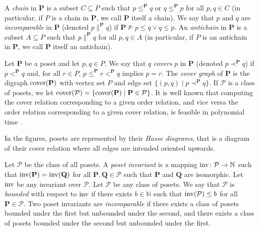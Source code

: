 \documentclass[usletter]{article}
\newcommand{\longversion}[1]{#1}
\newcommand{\shortversion}[1]{}
\newcommand{\longshort}[2]{\longversion{#1}\shortversion{#2}}
\newcommand{\pp}{\mathbf{P}}
\begin{document}
A \emph{chain} in $\pp$ is a subset $C \subseteq P$ 
such that $p \leq^{\pp} q$ or $q \leq^{\pp} p$ for all $p,q \in C$ 
(in particular, if $P$ is a chain in $\pp$, 
we call $\pp$ itself a chain).  
We say that $p$ and $q$ are \emph{incomparable} 
in $\pp$ (denoted $p \parallel^{\pp} q$) if 
$\pp \not\models p \leq q \vee q\leq p$.  
An \emph{antichain} in $\pp$ is a subset $A \subseteq P$ 
such that $p \parallel^{\pp} q$ for all $p,q \in A$ 
(in particular, if $P$ is an antichain in $\pp$, 
we call $\pp$ itself an antichain).  

Let $\pp$ be a poset and let $p,q \in P$.  We say that $q$ \emph{covers} $p$ in $\pp$ (denoted $p \prec^{\pp} q$) 
if $p<^{\pp}q$ and, for all $r \in P$, $p \leq^{\pp} r <^{\pp}q$ implies $p=r$.  
The \emph{cover graph} of $\pp$ is the digraph $\textup{cover}(\pp)$ with vertex set $P$ 
and edge set $\{ (p,q) \mid p \prec^{\pp} q \}$.  
If $\mathcal{P}$ 
is a class of posets, we let $\textup{cover}(\mathcal{P})=\{ \textup{cover}(\pp) \mid \pp \in \mathcal{P} \}$. 
\longshort{It is well known that 
computing the cover relation corresponding to a given order relation, 
and vice versa the order relation corresponding to a given cover relation, 
is feasible in polynomial time \cite{Schroder03}.}{It is well known that 
computing the cover relation corresponding to a given order relation, 
and vice versa the order relation corresponding to a given cover relation, 
is feasible in polynomial time \cite{Schroder03}.}

In the figures, 
posets are represented by their \emph{Hasse diagrams}, 
that is a diagram of their cover relation 
where all edges are intended oriented upwards.  



Let $\mathcal{P}$ be the class of all posets.  A \emph{poset invariant} 
is a mapping $\textup{inv} \colon \mathcal{P} \to \mathbb{N}$ such that $\textup{inv}(\mathbf{P})=\textup{inv}(\mathbf{Q})$ 
for all $\mathbf{P},\mathbf{Q} \in \mathcal{P}$ such that $\mathbf{P}$ and $\mathbf{Q}$ are isomorphic.  
Let $\textup{inv}$ be any invariant over $\mathcal{P}$.  Let $\mathcal{P}$ be any class of posets.  
We say that $\mathcal{P}$ is \emph{bounded} with respect to $\textup{inv}$ if there exists $b\in \mathbb{N}$ such that 
$\textup{inv}(\mathcal{P})\leq b$ for all $\mathbf{P} \in \mathcal{P}$.  
Two poset invariants are \emph{incomparable} if there exists a class of posets 
bounded under the first but unbounded under the second, and there exists a class of posets  bounded under the second but unbounded under the first.
\end{document}
